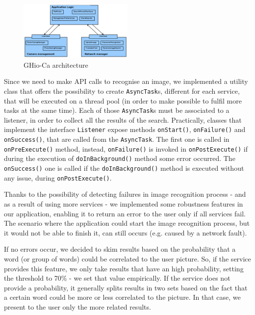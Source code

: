 \begin{figure}[h]
    \centering
    \includegraphics[width=0.50\textwidth]{../img/ghioca_macro_component}
    \caption{GHio-Ca architecture}
    \label{fig:architecture}
\end{figure}

Since we need to make API calls to recognise an image, we implemented a
utility class that offers the possibility to create \texttt{AsyncTask}s,
different for each service, that will be executed on a thread pool (in order to
make possible to fulfil more tasks at the same time). Each of those
\texttt{AsyncTask}s must be associated to a listener, in order to collect all
the results of the search. Practically, classes that implement the interface
\texttt{Listener} expose methods \texttt{onStart()}, \texttt{onFailure()} and
\texttt{onSuccess()}, that are called from the \texttt{AsyncTask}. The first one
is called in \texttt{onPreExecute()} method, instead, \texttt{onFailure()} is 
invoked in \texttt{onPostExecute()} if during the execution of \texttt{doInBackground()} 
method some error occurred. The \texttt{onSuccess()} one is called if the 
\texttt{doInBackground()} method is executed without any issue, during 
\texttt{onPostExecute()}.

Thanks to the possibility of detecting failures in image recognition process - 
and as a result of using more services - we implemented some robustness features 
in our application, enabling it to return an error to the user only if all 
services fail. The scenario where the application could start the image 
recognition process, but it would not be able to finish it, can still occurs 
(e.g. caused by a network fault).

If no errors occur, we decided to skim results based on the probability that a
word (or group of words) could be correlated to the user picture. So, if the
service provides this feature, we only take results that have an high
probability, setting the threshold to 70\% - we set that value empirically. If 
the service does not provide a probability, it generally splits results in two 
sets based on the fact that a certain word could be more or less correlated to 
the picture. In that case, we present to the user only the more related results.

